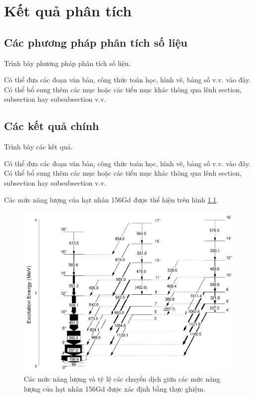 \chapter{Kết quả phân tích}
\label{ch:ketquaphantich}
\section{Các phương pháp phân tích số liệu}
Trình bày phương pháp phân tích số liệu. 

Có thể đưa các đoạn văn bản, công thức toán học, hình vẽ, bảng số v.v. vào đây. Có thể bổ sung thêm các mục hoặc các tiểu mục khác thông qua lênh section, subsection hay subsubsection v.v.

\section{Các kết quả chính}
Trình bày các kết quả. 

Có thể đưa các đoạn văn bản, công thức toán học, hình vẽ, bảng số v.v. vào đây. Có thể bổ sung thêm các mục hoặc các tiểu mục khác thông qua lênh section, subsection hay subsubsection v.v.

Các mức năng lượng của hạt nhân 156Gd được thể hiện trên hình \ref{fig:156Gd}.

\begin{figure}[!h]
\centering
\includegraphics[width=0.4\paperwidth]{figure/fig_ketquaphantich/156Gd.png}
\caption{Các mức năng lượng và tỷ lệ các chuyển dịch giữa các mức năng lượng của hạt nhân 156Gd được xác định bằng thực ghiệm.}
\label{fig:156Gd}
\end{figure}